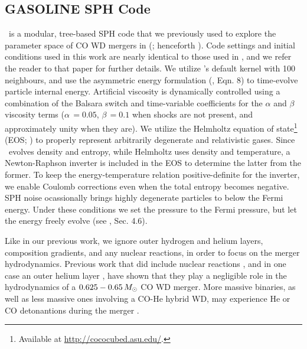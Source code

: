 \subsection{GASOLINE SPH Code}
\label{ssec:c3_gasoline}

\gasoline\ is a modular, tree-based SPH code that we previously used to explore the parameter space of CO WD mergers in \citeauthor{zhu+13} (\citeyear{zhu+13}; henceforth \citeal{zhu+13}).  Code settings and initial conditions used in this work are nearly identical to those used in \citeal{zhu+13}, and we refer the reader to that paper for further details.  We utilize \gasoline's default \cite{hernk89} kernel with 100 neighbours, and use the asymmetric energy formulation (\citeauthor{wadssq04}, Eqn. 8) to time-evolve particle internal energy.  Artificial viscosity is dynamically controlled using a combination of the Balsara switch and time-variable coefficients for the $\alpha$ and $\beta$ viscosity terms ($\alpha\,=0.05$, $\beta\,=0.1$ when shocks are not present, and approximately unity when they are).  We utilize the Helmholtz equation of state\footnote{Available at \url{http://cococubed.asu.edu/}.} (EOS; \citealt{timms00}) to properly represent arbitrarily degenerate and relativistic gases.  Since \gasoline\ evolves density and entropy, while Helmholtz uses density and temperature, a Newton-Raphson inverter is included in the EOS to determine the latter from the former.  To keep the energy-temperature relation positive-definite for the inverter, we enable Coulomb corrections even when the total entropy becomes negative.  SPH noise ocassionally brings highly degenerate particles to below the Fermi energy.  Under these conditions we set the pressure to the Fermi pressure, but let the energy freely evolve (see \citealt{zhu+13}, Sec. 4.6).

Like in our previous work, we ignore outer hydrogen and helium layers, composition gradients, and any nuclear reactions, in order to focus on the merger hydrodynamics.  Previous work that did include nuclear reactions \citep{loreig09,dan+12}, and in one case an outer helium layer \citep{rask+12}, have shown that they play a negligible role in the hydrodynamics of a $0.625 - 0.65\,\Msun$ CO WD merger.  More massive binaries, as well as less massive ones involving a CO-He hybrid WD, may experience He or CO detonantions during the merger \citep{pakm+10, rask+12, dan+12}.

